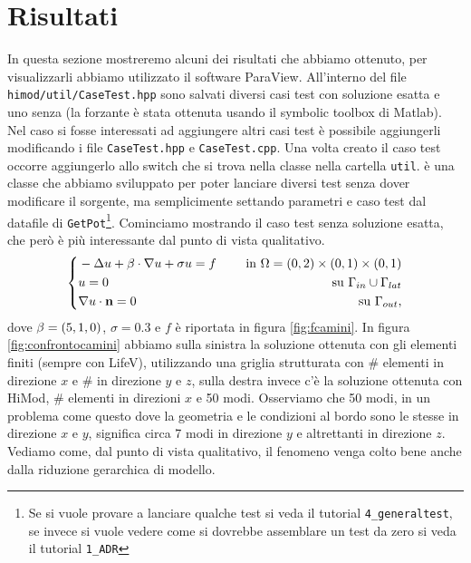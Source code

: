 \chapter{Risultati}
In questa sezione mostreremo alcuni dei risultati che abbiamo ottenuto, per visualizzarli abbiamo utilizzato
il software ParaView.
All'interno del file \texttt{himod/util/CaseTest.hpp} sono salvati diversi casi test
con soluzione esatta e uno senza (la forzante \`e stata ottenuta usando il symbolic toolbox di Matlab).
Nel caso si fosse interessati ad aggiungere altri casi test \`e possibile aggiungerli modificando i
file \texttt{CaseTest.hpp} e \texttt{CaseTest.cpp}. Una volta creato il caso test 
occorre aggiungerlo allo switch che si trova nella classe  nella
cartella \texttt{util}.  \`e una classe che abbiamo sviluppato per poter
lanciare diversi test senza dover modificare il sorgente, ma semplicimente settando 
parametri  e caso test dal datafile di \texttt{GetPot}\footnote{Se si vuole provare a lanciare qualche test si veda il tutorial
\texttt{4\_generaltest}, se invece si vuole vedere come si dovrebbe assemblare un test da zero si veda il tutorial \texttt{1\_ADR} }.
Cominciamo mostrando il caso test senza soluzione esatta, che per\`o \`e pi\`u interessante dal punto di vista qualitativo.
\begin{equation}
 \label{eq:camini}
 \left\{
\begin{aligned}
 &-\Delta u + \mathbf{\beta}\cdot\nabla u + \sigma u = f &\quad \text{ in }\Omega=(0,2)\times(0,1)\times(0,1)\\
 &u=0 &\quad \text{ su } \Gamma_{in} \cup \Gamma_{lat}\\
 &\nabla u\cdot \mathbf{n} = 0 &\quad \text{ su } \Gamma_{out},
\end{aligned}
\right.
\end{equation}
dove $\mathbf{\beta}=(5,1,0)$, $\sigma=0.3$ e $f$ \`e riportata in figura \ref{fig:fcamini}.
In figura \ref{fig:confrontocamini} abbiamo sulla sinistra la soluzione ottenuta con 
gli elementi finiti (sempre con LifeV), utilizzando una griglia strutturata con \# elementi in direzione $x$
e \# in direzione $y$ e $z$, sulla destra invece c'\`e la soluzione ottenuta con HiMod, \# elementi in direzioni $x$
e 50 modi. Osserviamo che 50 modi, in un problema come questo dove la geometria e le condizioni al bordo sono le stesse in direzione
$x$ e $y$, significa circa 7 modi in direzione $y$ e altrettanti in direzione $z$.
Vediamo come, dal punto di vista qualitativo, il fenomeno venga colto bene anche dalla riduzione gerarchica di modello.
